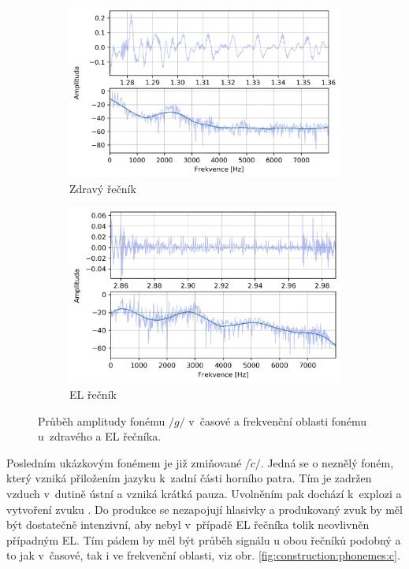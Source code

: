 \begin{figure}[htpb]
  \centering
  \begin{subfigure}[b]{0.45\textwidth}
    \includegraphics[width=\textwidth]{./ch5-construction/img/signal-normal_g.png}
    \caption{Zdravý řečník}
    \label{fig:construction:phonemes:g:normal}
  \end{subfigure}
  \begin{subfigure}[b]{0.45\textwidth}
    \includegraphics[width=\textwidth]{./ch5-construction/img/signal-el_g.png}
    \caption{EL řečník}
    \label{fig:construction:phonemes:g:el}
  \end{subfigure}
  \caption[Průběh amplitudy fonému $/g/$ zdravého a EL řečníka.]{Průběh amplitudy fonému $/g/$ v~časové a frekvenční oblasti fonému u~zdravého a EL řečníka.}
  \label{fig:construction:phonemes:g}
\end{figure}

Posledním ukázkovým fonémem je již zmiňované $/\check{c}/$.
Jedná se o neznělý foném, který vzniká přiložením jazyku  k~zadní části horního patra.
Tím je zadržen vzduch v~dutině ústní a vzniká krátká pauza.
Uvolněním pak dochází  k~explozi a vytvoření zvuku \cite{Psutka2006}.
Do produkce se nezapojují hlasivky a produkovaný zvuk by měl být dostatečně intenzivní, aby nebyl v~případě EL řečníka tolik neovlivněn případným EL.
Tím pádem by měl být průběh signálu u obou řečníků podobný a to jak v~časové, tak i ve frekvenční oblasti, viz obr. \ref{fig:construction:phonemes:c}.

